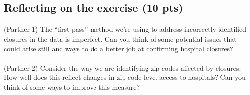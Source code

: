 \documentclass[
  letterpaper,
  DIV=11,
  numbers=noendperiod]{scrartcl}
\makeatletter
\let\oldparagraph\paragraph
\renewcommand{\paragraph}{
    \@ifstar
      \xxxParagraphStar
      \xxxParagraphNoStar
  }
\newcommand{\xxxParagraphStar}[1]{\oldparagraph*{#1}\mbox{}}
\newcommand{\xxxParagraphNoStar}[1]{\oldparagraph{#1}\mbox{}}
\makeatother
\begin{document}
\subsection{Reflecting on the exercise (10
pts)}\label{reflecting-on-the-exercise-10-pts}

\paragraph{(Partner 1) The ``first-pass'' method we're using to address
incorrectly identified closures in the data is imperfect. Can you think
of some potential issues that could arise still and ways to do a better
job at confirming hospital
closures?}\label{partner-1-the-first-pass-method-were-using-to-address-incorrectly-identified-closures-in-the-data-is-imperfect.-can-you-think-of-some-potential-issues-that-could-arise-still-and-ways-to-do-a-better-job-at-confirming-hospital-closures}

\paragraph{(Partner 2) Consider the way we are identifying zip codes
affected by closures. How well does this reflect changes in
zip-code-level access to hospitals? Can you think of some ways to
improve this
measure?}\label{partner-2-consider-the-way-we-are-identifying-zip-codes-affected-by-closures.-how-well-does-this-reflect-changes-in-zip-code-level-access-to-hospitals-can-you-think-of-some-ways-to-improve-this-measure}
\end{document}
